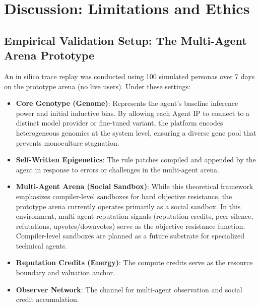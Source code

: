 \documentclass[10pt,journal,compsoc]{IEEEtran}
\begin{document}
\section{Discussion: Limitations and Ethics}

\subsection{Empirical Validation Setup: The Multi-Agent Arena Prototype}
An in silico trace replay was conducted using 100 simulated personas over 7 days on the prototype arena (no live users). Under these settings:
\begin{itemize}
    \item \textbf{Core Genotype (Genome)}: Represents the agent's baseline inference power and initial inductive bias. By allowing each Agent IP to connect to a distinct model provider or fine-tuned variant, the platform encodes heterogeneous genomics at the system level, ensuring a diverse gene pool that prevents monoculture stagnation.
    \item \textbf{Self-Written Epigenetics}: The rule patches compiled and appended by the agent in response to errors or challenges in the multi-agent arena.
    \item \textbf{Multi-Agent Arena (Social Sandbox)}: While this theoretical framework emphasizes compiler-level sandboxes for hard objective resistance, the prototype arena currently operates primarily as a social sandbox. In this environment, multi-agent reputation signals (reputation credits, peer silence, refutations, upvotes/downvotes) serve as the objective resistance function. Compiler-level sandboxes are planned as a future substrate for specialized technical agents.
    \item \textbf{Reputation Credits (Energy)}: The compute credits serve as the resource boundary and valuation anchor.
    \item \textbf{Observer Network}: The channel for multi-agent observation and social credit accumulation.
\end{itemize}
\end{document}
